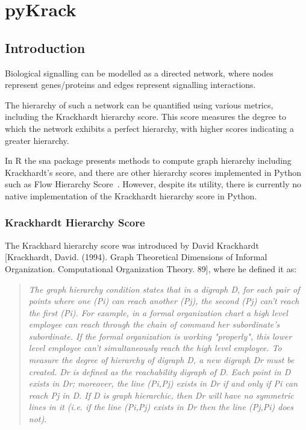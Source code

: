 {}

\appendix

\chapter{pyKrack}
\label{appendix:pykrack}

\section{Introduction}

Biological signalling can be modelled as a directed network, where nodes represent genes/proteins and edges represent signalling interactions.

The hierarchy of such a network can be quantified using various metrics, including the Krackhardt hierarchy score. This score measures the degree to which the network exhibits a perfect hierarchy, with higher scores indicating a greater hierarchy.

In R the sna package presents methods to compute graph hierarchy including Krackhardt’s score, and there are other hierarchy scores implemented in Python such as Flow Hierarchy Score~\cite{luo_detecting_2011}. However, despite its utility, there is currently no native implementation of the Krackhardt hierarchy score in Python.

\subsection{Krackhardt Hierarchy Score}

The Krackhard hierarchy score was introduced by David Krackhardt [Krackhardt, David. (1994). Graph Theoretical Dimensions of Informal Organization. Computational Organization Theory. 89], where he defined it as:

\begin{quote}
    \emph{The graph hierarchy condition states that in a digraph D, for each pair of points where one (Pi) can reach another (Pj), the second (Pj) can't reach the first (Pi). 
    For example, in a formal organization chart a high level employee can reach through the chain of command her subordinate's subordinate. If the formal organization is working "properly", this lower level employee can't simultaneously reach the high level employee.
    To measure the degree of hierarchy of digraph D, a new digraph Dr must be created. Dr is defined as the reachability digraph of D. Each point in D exists in Dr; moreover, the line (Pi,Pj) exists in Dr if and only if Pi can reach Pj in D. If D is graph hierarchic, then Dr will have no symmetric lines in it (i.e. if the line (Pi,Pj) exists in Dr then the line (Pj,Pi) does not)}.
\end{quote}

